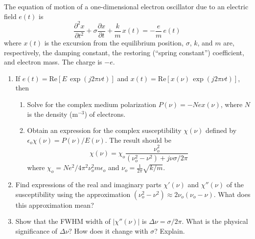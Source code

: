 
\begin{question}[Question 1]The equation of motion of a one-dimensional electron oscillator due to an
electric field $e(t)$ is
\begin{equation*}
  \frac{\partial^{2}x}{\partial t^{2}}
  + \sigma\frac{\partial x}{\partial t}
  + \frac{k}{m}\,x(t)
  = -\frac{e}{m}\,e(t)
\end{equation*}
where $x(t)$ is the excursion from the equilibrium position, $\sigma$, $k$, and $m$ are,
respectively, the damping constant, the restoring (``spring constant'') coefficient, and electron
mass. The charge is $-e$.

\begin{enumerate}[label=(\Alph*)]

  \item If $e(t)=\mathrm{Re}[E\,\exp(j2\pi\nu t)]$ and
        $x(t)=\mathrm{Re}[x(\nu)\,\exp(j2\pi\nu t)]$, then
        \begin{enumerate}[label=(\arabic*)]
          \item Solve for the complex medium polarization
                $P(\nu)=-Nex(\nu)$, where $N$ is the density (m$^{-3}$) of electrons.
          \item Obtain an expression for the complex susceptibility $\chi(\nu)$ defined by
                $\epsilon_{o}\chi(\nu)=P(\nu)/E(\nu)$. The result should be
                \begin{equation*}
                  \chi(\nu)=\chi_{o}
                  \frac{\nu_{o}^{2}}{(\nu_{o}^{2}-\nu^{2})+j\nu\sigma/2\pi}
                \end{equation*}
                where $\chi_{o}=Ne^{2}/4\pi^{2}\nu_{o}^{2}m\epsilon_{o}$ and
                $\nu_{o}=\tfrac{1}{2\pi}\sqrt{k/m}$.
        \end{enumerate}

  \item Find expressions of the real and imaginary parts $\chi'(\nu)$ and $\chi''(\nu)$ of the
        susceptibility using the approximation
        $(\nu_{o}^{2}-\nu^{2})\approx 2\nu_{o}(\nu_{o}-\nu)$.
        What does this approximation mean?

  \item Show that the FWHM width of $|\chi''(\nu)|$ is $\Delta\nu=\sigma/2\pi$.
        What is the physical significance of $\Delta\nu$? How does it change with $\sigma$?
        Explain.


\end{enumerate}
\end{question}
